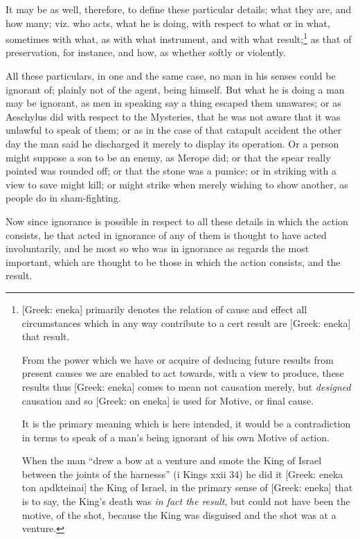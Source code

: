 It may be as well, therefore, to define these particular details; what they
are, and how many; viz. who acts, what he is doing, with respect to what or in
what, sometimes with what, as with what instrument, and with what result;\footnote{[Greek: eneka] primarily denotes the relation of cause and effect
all circumstances which in any way contribute to a cert result are [Greek:
eneka] that result.

From the power which we have or acquire of deducing future results from
present causes we are enabled to act towards, with a view to produce, these
results thus [Greek: eneka] comes to mean not causation merely, but
\emph{designed} causation and so [Greek: on eneka] is used for Motive, or final
cause.

It is the primary meaning which is here intended, it would be a
contradiction in terms to speak of a man’s being ignorant of his own
Motive of action.

When the man “drew a bow at a venture and smote the King of Israel
between the joints of the harnesss” (i Kings xxii 34) he did it [Greek:
eneka ton apdkteinai] the King of Israel, in the primary sense of [Greek:
eneka] that is to say, the King’s death was \emph{in fact the result},
but could not have been the motive, of the shot, because the King was disguised
and the shot was at a venture.}
as that of preservation, for instance, and how, as whether softly or violently.

All these particulars, in one and the same case, no man in his senses could be
ignorant of; plainly not of the agent, being himself. But what he is doing a
man may be ignorant, as men in speaking say a thing escaped them unawares; or
as Aeschylus did with respect to the Mysteries, that he was not aware that it
was unlawful to speak of them; or as in the case of that catapult accident the
other day the man said he discharged it merely to display its operation. Or a
person might suppose a son to be an enemy, as Merope did; or that the spear
really pointed was rounded off; or that the stone was a pumice; or in striking
with a view to save might kill; or might strike when merely wishing to show
another, as people do in sham-fighting.

Now since ignorance is possible in respect to all these details in which the
action consists, he that acted in ignorance of any of them is thought to have
acted involuntarily, and he most so who was in ignorance as regards the most
important, which are thought to be those in which the action consists, and the
result.


